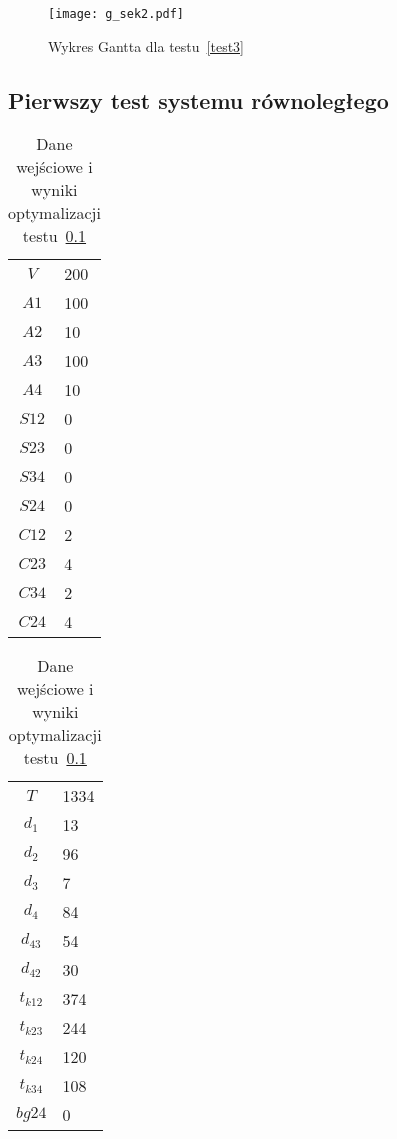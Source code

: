 \begin{figure}[H]
\centering
\texttt{[image: g\_sek2.pdf]}
\caption{Wykres Gantta dla testu~\ref{test3}}
\label{fig:res_3b}
\end{figure}



\subsection{Pierwszy test systemu równoległego} \label{test4}

\begin{table}[H]
\begin{minipage}[b]{0.5\linewidth}
\centering
\begin{tabular}{c l}
$V$ & 200 \\
$A1$ & 100 \\
$A2$ & 10 \\
$A3$ & 100 \\
$A4$ & 10 \\
$S12$ & 0 \\
$S23$ & 0 \\
$S34$ & 0 \\
$S24$ & 0 \\
$C12$ & 2 \\
$C23$ & 4 \\
$C34$ & 2 \\
$C24$ & 4 \\
\end{tabular}
\end{minipage}
\hspace{0.5cm}
\begin{minipage}[b]{0.5\linewidth}
\centering
\begin{tabular}{c l}
$T$ & 1334 \\
$d_{1}$ & 13 \\
$d_{2}$ & 96 \\
$d_{3}$ & 7 \\
$d_{4}$ & 84 \\
$d_{43}$ & 54 \\
$d_{42}$ & 30 \\
$t_{k12}$ & 374 \\
$t_{k23}$ & 244 \\
$t_{k24}$ & 120 \\
$t_{k34}$ & 108 \\
$bg24$ & 0 \\
\end{tabular}
\end{minipage}
\caption{Dane wejściowe i wyniki optymalizacji testu~\ref{test4}}
\label{tab:res_4a}
\end{table}

